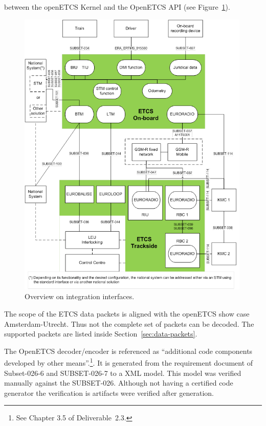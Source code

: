 between the openETCS Kernel and the OpenETCS API (see Figure~\ref{fig:integration}).


\begin{figure}[hbt]
\begin{center}
\includegraphics[width=0.99\textwidth]{figures/integration.png}
\caption{\label{fig:integration}
        Overview on integration interfaces.}
\end{center}
\end{figure}


The scope of the ETCS data packets is aligned with the openETCS show case
Amsterdam-Utrecht.
Thus not the complete set of packets can be decoded.
The supported packets are listed inside Section~\ref{sec:data-packets}.
 
The OpenETCS decoder/encoder is referenced
as ``additional code components developed by other means''.\footnote{
	See Chapter 3.5 of Deliverable~2.3.
}.
It is generated from the requirement document of Subset-026-6
and SUBSET-026-7 to a XML model.
This model was verified manually against the SUBSET-026. 
Although not having a certified code generator the verification
is artifacts were verified after generation.

